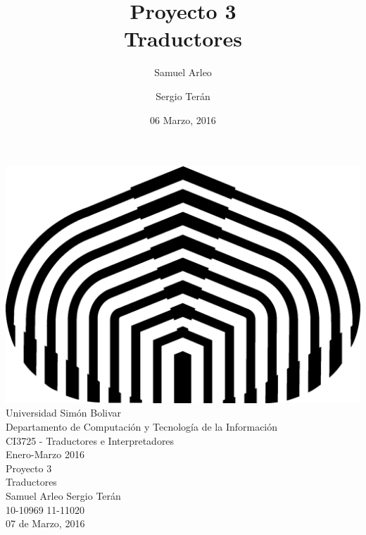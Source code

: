 \documentclass{article}
\title{Proyecto 3\\Traductores}
\author{Samuel Arleo\and Sergio Ter\'an }
\date{06 Marzo, 2016}
\begin{document}
		\begin{center}
		 	\pagestyle{headings} \small
		 	\includegraphics[scale=0.4]{USB.png}\\[0.3cm]
			Universidad Sim\'on Bolivar\\[0.1cm]
		 	Departamento de Computaci\'on y Tecnolog\'ia de la Informaci\'on\\[0.1cm]
		 	CI3725 - Traductores e Interpretadores\\[0.1cm]
		 	Enero-Marzo 2016\\[0.1cm]

			\vspace{15em}
			\LARGE Proyecto 3\\
			\vspace{0.5em}
			\Large Traductores\\
			\vspace{0.5em}
			\large Samuel Arleo \-\hspace{5em}Sergio Ter\'an\\
			\vspace{0.5em}
			\large 10-10969 \-\hspace{7em}11-11020\\
			\vspace{15em}
			07 de Marzo, 2016
		\end{center}

		\newpage
\end{document}
